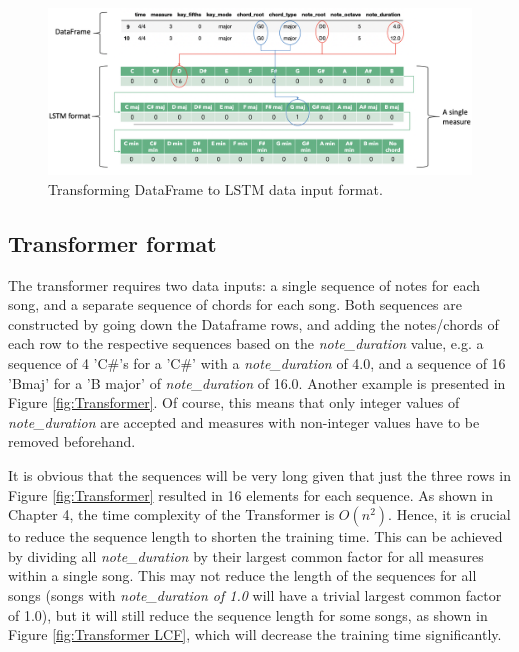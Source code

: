 \begin{figure}
    \centering
    \includegraphics[scale=0.3]{Figures/LSTM pictorial 4}
    \decoRule
    \caption{Transforming DataFrame to LSTM data input format.}
    \label{fig:LSTM}
    \end{figure}
    


\subsection{Transformer format}
The transformer requires two data inputs: a single sequence of notes for each song, and a separate sequence of chords for each song. Both sequences are constructed by going down the Dataframe rows, and adding the notes/chords of each row to the respective sequences based on the \emph{note\_duration} value, e.g. a sequence of 4 'C\#'s for a 'C\#' with a \emph{note\_duration} of 4.0, and a sequence of 16 'Bmaj' for a 'B major' of \emph{note\_duration} of 16.0. Another example is presented in Figure \ref{fig:Transformer}. Of course, this means that only integer values of \emph{note\_duration} are accepted and measures with non-integer values have to be removed beforehand.

It is obvious that the sequences will be very long given that just the three rows in Figure \ref{fig:Transformer} resulted in 16 elements for each sequence. As shown in Chapter 4, the time complexity of the Transformer is $O({n}^2)$. Hence, it is crucial to reduce the sequence length to shorten the training time. This can be achieved by dividing all \emph{note\_duration} by their largest common factor for all measures within a single song. This may not reduce the length of the sequences for all songs (songs with \emph{note\_duration of 1.0} will have a trivial largest common factor of 1.0), but it will still reduce the sequence length for some songs, as shown in Figure \ref{fig:Transformer LCF}, which will decrease the training time significantly.


